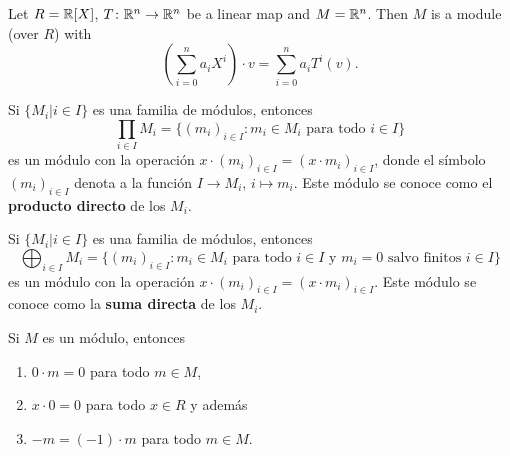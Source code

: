 %

\begin{example}
Let $R=\mathbb{R}[X]$, $T\colon\mathbb{R}^n\to\mathbb{R}^n$ be a linear map and $M=\mathbb{R}^n$. Then
$M$ is a module (over $R$) with  
\[
\left(\sum_{i=0}^na_iX^i\right)\cdot v=\sum_{i=0}^na_iT^i(v).
\]	
\end{example}

\begin{example}
Si $\{M_i|i\in I\}$ es una familia de módulos, entonces  	
\[
\prod_{i\in I}M_i=\{(m_i)_{i\in I}:m_i\in M_i\text{ para todo $i\in I$}\}
\]
es un módulo con
la operación 
$x\cdot (m_i)_{i\in I}=(x\cdot m_i)_{i\in I}$, 
donde el símbolo $(m_i)_{i\in I}$ denota a la función $I\to M_i$, $i\mapsto m_i$.
Este módulo se conoce como el \textbf{producto directo} de los $M_i$.
\end{example}

\begin{example}
Si $\{M_i|i\in I\}$ es una familia de módulos, entonces  	
\[
\bigoplus_{i\in I}M_i=\{(m_i)_{i\in I}:m_i\in M_i\text{ para todo $i\in I$ y $m_i=0$ salvo finitos $i\in I$}\}
\]
es un módulo con la operación
$x\cdot (m_i)_{i\in I}=(x\cdot m_i)_{i\in I}$. 
Este módulo se conoce como la \textbf{suma directa} de los $M_i$. 
\end{example}

\begin{exercise}
Si $M$ es un módulo, entonces
\begin{enumerate}
\item $0\cdot m=0$ para todo $m\in M$,
\item $x\cdot 0=0$ para todo $x\in R$ y además
\item $-m=(-1)\cdot m$ para todo $m\in M$. 	
\end{enumerate}
\end{exercise}

